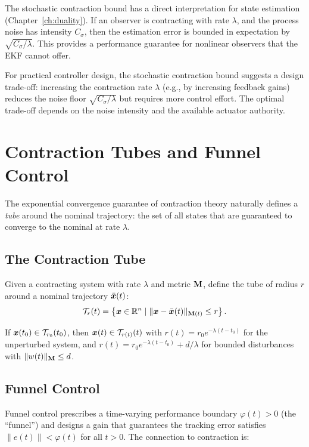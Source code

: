The stochastic contraction bound has a direct interpretation for state estimation
(Chapter~\ref{ch:duality}). If an observer is contracting with rate $\lambda$, and the
process noise has intensity $C_\sigma$, then the estimation error is bounded in
expectation by $\sqrt{C_\sigma / \lambda}$. This provides a performance guarantee for
nonlinear observers that the EKF cannot offer.

\begin{designbox}
For practical controller design, the stochastic contraction bound suggests a design
trade-off: increasing the contraction rate $\lambda$ (e.g., by increasing feedback gains)
reduces the noise floor $\sqrt{C_\sigma / \lambda}$ but requires more control effort.
The optimal trade-off depends on the noise intensity and the available actuator authority.
\end{designbox}


\section{Contraction Tubes and Funnel Control}

The exponential convergence guarantee of contraction theory naturally defines a
\emph{tube} around the nominal trajectory: the set of all states that are guaranteed
to converge to the nominal at rate $\lambda$.

\subsection{The Contraction Tube}

Given a contracting system with rate $\lambda$ and metric $\mathbf{M}$, define the tube
of radius $r$ around a nominal trajectory $\bar{\bm{x}}(t)$:
\begin{equation}
\mathcal{T}_r(t) = \left\{ \bm{x} \in \mathbb{R}^n \mid \|\bm{x} - \bar{\bm{x}}(t)\|_{\mathbf{M}(t)} \leq r \right\}.
\label{eq:ch4:tube}
\end{equation}

If $\bm{x}(t_0) \in \mathcal{T}_{r_0}(t_0)$, then $\bm{x}(t) \in \mathcal{T}_{r(t)}(t)$ with
$r(t) = r_0 e^{-\lambda(t - t_0)}$ for the unperturbed system, and
$r(t) = r_0 e^{-\lambda(t - t_0)} + d/\lambda$ for bounded disturbances with
$\|w(t)\|_{\mathbf{M}} \leq d$.

\subsection{Funnel Control}

Funnel control prescribes a time-varying performance boundary $\varphi(t) > 0$
(the ``funnel'') and designs a gain that guarantees the tracking error satisfies
$\|e(t)\| < \varphi(t)$ for all $t > 0$. The connection to contraction is:

